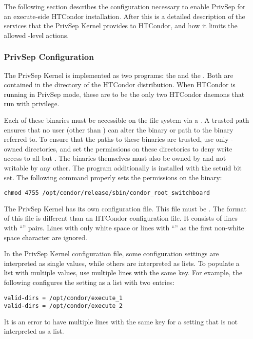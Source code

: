 The following section describes the configuration necessary
to enable PrivSep for an execute-side HTCondor installation.
After this is a detailed description of
the services that the PrivSep Kernel provides to HTCondor, and how it
limits the allowed -level actions.

\subsubsection{PrivSep Configuration}

The PrivSep Kernel is implemented as two programs:
the  and the .
Both are contained in
the  directory of the HTCondor distribution. When HTCondor is
running in PrivSep mode, these are to be the only two HTCondor daemons that run
with  privilege.

Each of these binaries must be accessible on the file system via a
. A trusted path ensures that no user (other than
) can alter the binary or path to the binary referred to.
To ensure that the
paths to these binaries are trusted, use only
-owned directories, and set the permissions on
these directories to deny write access to all but . 
The binaries themselves must also be owned by  
and not writable by any other.
The  program additionally
is installed with the setuid bit set. The following command
properly sets the permissions on the 
binary:
\begin{verbatim}
chmod 4755 /opt/condor/release/sbin/condor_root_switchboard
\end{verbatim}

The PrivSep Kernel has its own configuration file.
This file  must be .
The format of this file is different than 
an HTCondor configuration file.
It consists
of lines with ``'' pairs. 
Lines with only white space
or lines with ``\Code{\#}'' as the first non-white space character are ignored.

In the PrivSep Kernel configuration file,
some configuration settings are interpreted as single values, 
while others are interpreted as lists. 
To populate a list with multiple values,
use multiple lines with the same key.
For example, the following configures the 
setting as a list with two entries:
\begin{verbatim}
valid-dirs = /opt/condor/execute_1
valid-dirs = /opt/condor/execute_2
\end{verbatim}
It is an error to have multiple lines with the same key for a setting
that is not interpreted as a list.

